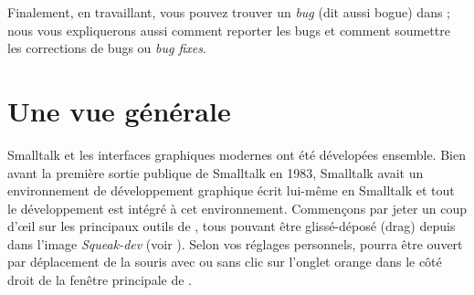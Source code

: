 \documentclass[a4paper,10pt,twoside]{book}
\begin{document}
Finalement, en travaillant, vous pouvez trouver un \emph{bug} (dit aussi bogue) dans \sq;
nous vous expliquerons aussi comment reporter les bugs
et comment soumettre les corrections de bugs ou \emph{bug fixes}.

\section{Une vue g\'en\'erale}
\label{sec:overview}

Smalltalk et les interfaces graphiques modernes ont \'et\'e d\'evelop\'ees ensemble.
Bien avant la premi\`ere sortie publique de Smalltalk en 1983, Smalltalk
avait un environnement de d\'eveloppement graphique écrit lui-même en Smalltalk et
tout le d\'eveloppement est intégré à cet environnement.
Commen\c{c}ons par jeter un coup d'\oe il sur les principaux outils de \sq,
tous pouvant \^etre gliss\'e-d\'epos\'e (drag) depuis \toolsflapind
dans l'image \emph{Squeak-dev} (voir ).
Selon vos r\'eglages personnels, \toolsflap{} pourra \^etre ouvert
par d\'eplacement de la souris avec ou sans clic sur l'onglet orange
dans le c\^ot\'e droit de la fen\^etre principale de \sq.
\end{document}
